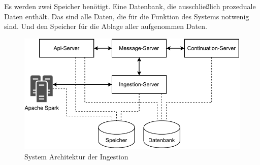 Es werden zwei Speicher benötigt.
Eine Datenbank, die ausschließlich prozeduale Daten enthält.
Das sind alle Daten, die für die Funktion des Systems notwenig sind.
Und den Speicher für die Ablage aller aufgenommen Daten.

\begin{figure}
    \centering
    \includegraphics{Grafiken/Entwicklung-System-Architektur.pdf}
    \caption{System Architektur der Ingestion}
    \label{fig:system-architektur}
\end{figure}
